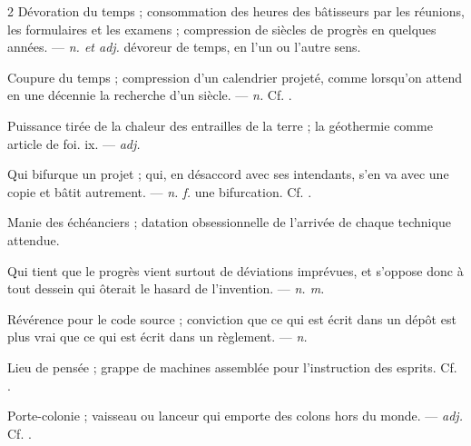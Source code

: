 \begin{multicols}{2}
 Dévoration du temps ;   consommation des heures des bâtisseurs par les réunions, les formulaires et les examens ;   compression de siècles de progrès en quelques années. —  \textit{n. et adj.} dévoreur de temps, en l'un ou l'autre sens.

 Coupure du temps ; compression d'un calendrier projeté, comme lorsqu'on attend en une décennie la recherche d'un siècle. —  \textit{n.} Cf. .

 Puissance tirée de la chaleur des entrailles de la terre ; la géothermie comme article de foi.   ix. —  \textit{adj.}

 Qui bifurque un projet ; qui, en désaccord avec ses intendants, s'en va avec une copie et bâtit autrement.  —  \textit{n. f.} une bifurcation. Cf. .

 Manie des échéanciers ; datation obsessionnelle de l'arrivée de chaque technique attendue.

 Qui tient que le progrès vient surtout de déviations imprévues, et s'oppose donc à tout dessein qui ôterait le hasard de l'invention. —  \textit{n. m.}

 Révérence pour le code source ; conviction que ce qui est écrit dans un dépôt est plus vrai que ce qui est écrit dans un règlement. —  \textit{n.}

 Lieu de pensée ; grappe de machines assemblée pour l'instruction des esprits.   Cf. .

 Porte-colonie ; vaisseau ou lanceur qui emporte des colons hors du monde. —  \textit{adj.} Cf. .


\end{multicols}
